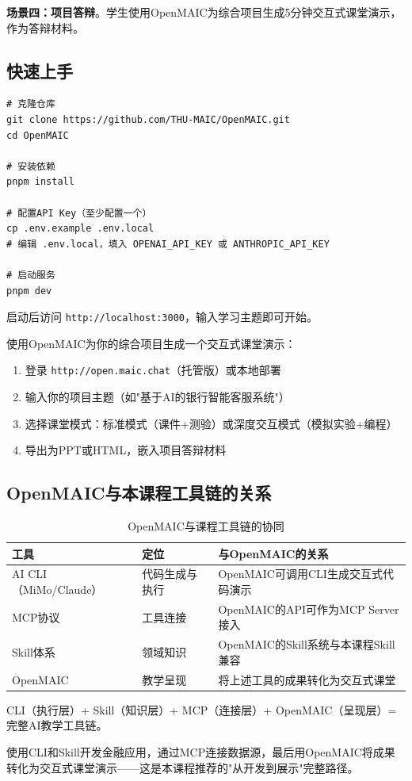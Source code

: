 \textbf{场景四：项目答辩}。学生使用OpenMAIC为综合项目生成5分钟交互式课堂演示，作为答辩材料。

\subsection{快速上手}

\begin{lstlisting}[style=shell]
# 克隆仓库
git clone https://github.com/THU-MAIC/OpenMAIC.git
cd OpenMAIC

# 安装依赖
pnpm install

# 配置API Key（至少配置一个）
cp .env.example .env.local
# 编辑 .env.local，填入 OPENAI_API_KEY 或 ANTHROPIC_API_KEY

# 启动服务
pnpm dev
\end{lstlisting}

启动后访问 \texttt{http://localhost:3000}，输入学习主题即可开始。

\begin{notebox}[实践任务]
使用OpenMAIC为你的综合项目生成一个交互式课堂演示：
\begin{enumerate}[leftmargin=1.5em]
  \item 登录 \texttt{http://open.maic.chat}（托管版）或本地部署
  \item 输入你的项目主题（如"基于AI的银行智能客服系统"）
  \item 选择课堂模式：标准模式（课件+测验）或深度交互模式（模拟实验+编程）
  \item 导出为PPT或HTML，嵌入项目答辩材料
\end{enumerate}
\end{notebox}

\subsection{OpenMAIC与本课程工具链的关系}

\begin{table}[H]
\centering
\begin{tabular}{lll}
\toprule
\textbf{工具} & \textbf{定位} & \textbf{与OpenMAIC的关系} \\
\midrule
AI CLI（MiMo/Claude） & 代码生成与执行 & OpenMAIC可调用CLI生成交互式代码演示 \\
MCP协议 & 工具连接 & OpenMAIC的API可作为MCP Server接入 \\
Skill体系 & 领域知识 & OpenMAIC的Skill系统与本课程Skill兼容 \\
OpenMAIC & 教学呈现 & 将上述工具的成果转化为交互式课堂 \\
\bottomrule
\end{tabular}
\caption{OpenMAIC与课程工具链的协同}
\end{table}

\begin{notebox}[黄金组合]
CLI（执行层）+ Skill（知识层）+ MCP（连接层）+ OpenMAIC（呈现层）= 完整AI教学工具链。

使用CLI和Skill开发金融应用，通过MCP连接数据源，最后用OpenMAIC将成果转化为交互式课堂演示——这是本课程推荐的"从开发到展示"完整路径。
\end{notebox}
